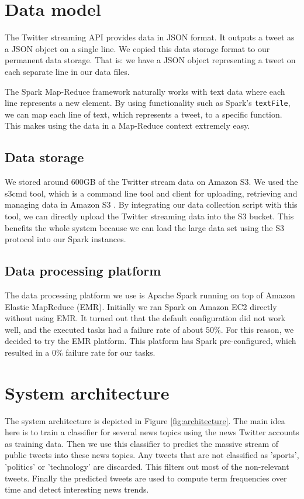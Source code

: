 \documentclass{llncs}
\begin{document}
\section{Data model}
The Twitter streaming API provides data in JSON format. It outputs a tweet as a JSON object on a single line. We copied this data storage format to our permanent data storage. That is: we have a JSON object representing a tweet on each separate line in our data files.

The Spark Map-Reduce framework naturally works with text data where each line represents a new element. By using functionality such as Spark's \texttt{textFile}, we can map each line of text, which represents a tweet, to a specific function. This makes using the data in a Map-Reduce context extremely easy.

\subsection{Data storage}
We stored around 600GB of the Twitter stream data on Amazon S3. We used the s3cmd tool, which is a command line tool and client for uploading, retrieving and managing data in Amazon S3 \cite{s3cmd}. By integrating our data collection script with this tool, we can directly upload the Twitter streaming data into the S3 bucket. This benefits the whole system because we can load the large data set using the S3 protocol into our Spark instances.

\subsection{Data processing platform}
The data processing platform we use is Apache Spark running on top of Amazon Elastic MapReduce (EMR). Initially we ran Spark on Amazon EC2 directly without using EMR. It turned out that the default configuration did not work well, and the executed tasks had a failure rate of about 50\%. For this reason, we decided to try the EMR platform. This platform has Spark pre-configured, which resulted in a 0\% failure rate for our tasks.

\section{System architecture}
The system architecture is depicted in Figure \ref{fig:architecture}. The main idea here is to train a classifier for several news topics using the news Twitter accounts as training data. Then we use this classifier to predict the massive stream of public tweets into these news topics. Any tweets that are not classified as 'sports', 'politics' or 'technology' are discarded. This filters out most of the non-relevant tweets. Finally the predicted tweets are used to compute term frequencies over time and detect interesting news trends.
\end{document}
